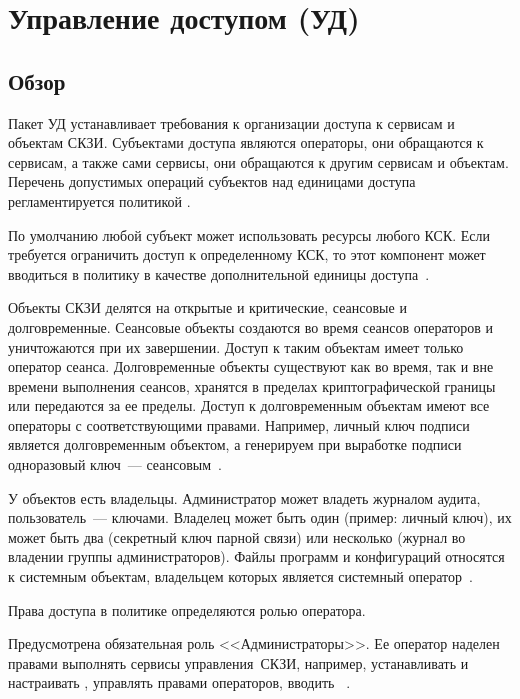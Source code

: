 \section{Управление доступом (УД)}\label{AC}

\subsection{Обзор}\label{AC.Intro}

Пакет УД устанавливает требования к организации доступа к сервисам и объектам 
СКЗИ.
%
Субъектами доступа являются операторы, они обращаются к сервисам, 
а также сами сервисы, они обращаются к другим сервисам и объектам.
%
Перечень допустимых операций субъектов над единицами доступа 
регламентируется политикой .

По умолчанию любой субъект может использовать ресурсы любого КСК. Если требуется
ограничить доступ к определенному КСК, то этот компонент может вводиться в
политику в качестве дополнительной единицы доступа~.

Объекты СКЗИ делятся на открытые и критические, сеансовые и долговременные.
%
Сеансовые объекты создаются во время сеансов операторов и уничтожаются
при их завершении. Доступ к таким объектам имеет только оператор сеанса.
%
Долговременные объекты существуют как во время, так и вне времени выполнения
сеансов, хранятся в пределах криптографической границы или передаются за ее
пределы.
%
Доступ к долговременным объектам имеют все операторы с соответствующими 
правами. Например, личный ключ подписи является долговременным объектом, а 
генерируем при выработке подписи одноразовый ключ~--- 
сеансовым~.

У объектов есть владельцы. 
%
Администратор может владеть журналом аудита, 
пользователь~--- ключами.
%
Владелец может быть один (пример: личный ключ),
их может быть два (секретный ключ парной связи) или несколько 
(журнал во владении группы администраторов).
%
Файлы программ и конфигураций относятся к системным объектам,
владельцем которых является системный оператор~.

Права доступа в политике определяются ролью оператора. 

Предусмотрена обязательная роль <<Администраторы>>. 
Ее оператор наделен правами выполнять сервисы управления~СКЗИ, например, 
устанавливать и настраивать , управлять правами операторов, 
вводить ~.

